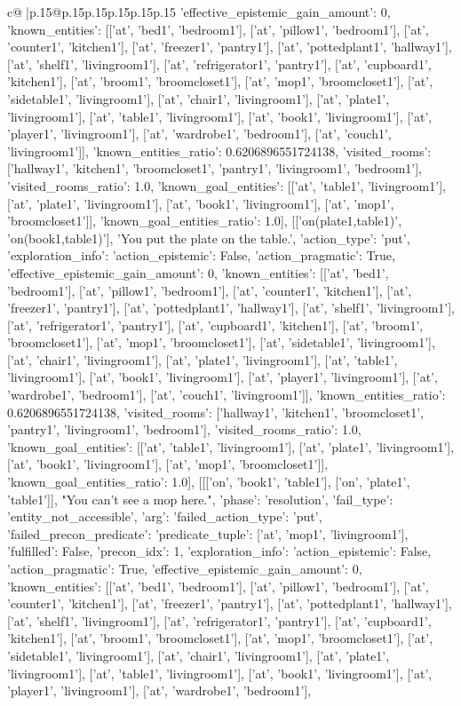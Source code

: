 \documentclass{article}
\begin{document}
{\begin{supertabular}{c@{$\;$}|p{.15\linewidth}@{}p{.15\linewidth}p{.15\linewidth}p{.15\linewidth}p{.15\linewidth}p{.15\linewidth}}
{{{'effective_epistemic_gain_amount': 0, 'known_entities': [['at', 'bed1', 'bedroom1'], ['at', 'pillow1', 'bedroom1'], ['at', 'counter1', 'kitchen1'], ['at', 'freezer1', 'pantry1'], ['at', 'pottedplant1', 'hallway1'], ['at', 'shelf1', 'livingroom1'], ['at', 'refrigerator1', 'pantry1'], ['at', 'cupboard1', 'kitchen1'], ['at', 'broom1', 'broomcloset1'], ['at', 'mop1', 'broomcloset1'], ['at', 'sidetable1', 'livingroom1'], ['at', 'chair1', 'livingroom1'], ['at', 'plate1', 'livingroom1'], ['at', 'table1', 'livingroom1'], ['at', 'book1', 'livingroom1'], ['at', 'player1', 'livingroom1'], ['at', 'wardrobe1', 'bedroom1'], ['at', 'couch1', 'livingroom1']], 'known_entities_ratio': 0.6206896551724138, 'visited_rooms': ['hallway1', 'kitchen1', 'broomcloset1', 'pantry1', 'livingroom1', 'bedroom1'], 'visited_rooms_ratio': 1.0, 'known_goal_entities': [['at', 'table1', 'livingroom1'], ['at', 'plate1', 'livingroom1'], ['at', 'book1', 'livingroom1'], ['at', 'mop1', 'broomcloset1']], 'known_goal_entities_ratio': 1.0}}], [['on(plate1,table1)', 'on(book1,table1)'], 'You put the plate on the table.', {'action_type': 'put', 'exploration_info': {'action_epistemic': False, 'action_pragmatic': True, 'effective_epistemic_gain_amount': 0, 'known_entities': [['at', 'bed1', 'bedroom1'], ['at', 'pillow1', 'bedroom1'], ['at', 'counter1', 'kitchen1'], ['at', 'freezer1', 'pantry1'], ['at', 'pottedplant1', 'hallway1'], ['at', 'shelf1', 'livingroom1'], ['at', 'refrigerator1', 'pantry1'], ['at', 'cupboard1', 'kitchen1'], ['at', 'broom1', 'broomcloset1'], ['at', 'mop1', 'broomcloset1'], ['at', 'sidetable1', 'livingroom1'], ['at', 'chair1', 'livingroom1'], ['at', 'plate1', 'livingroom1'], ['at', 'table1', 'livingroom1'], ['at', 'book1', 'livingroom1'], ['at', 'player1', 'livingroom1'], ['at', 'wardrobe1', 'bedroom1'], ['at', 'couch1', 'livingroom1']], 'known_entities_ratio': 0.6206896551724138, 'visited_rooms': ['hallway1', 'kitchen1', 'broomcloset1', 'pantry1', 'livingroom1', 'bedroom1'], 'visited_rooms_ratio': 1.0, 'known_goal_entities': [['at', 'table1', 'livingroom1'], ['at', 'plate1', 'livingroom1'], ['at', 'book1', 'livingroom1'], ['at', 'mop1', 'broomcloset1']], 'known_goal_entities_ratio': 1.0}}], [[['on', 'book1', 'table1'], ['on', 'plate1', 'table1']], "You can't see a mop here.", {'phase': 'resolution', 'fail_type': 'entity_not_accessible', 'arg': {'failed_action_type': 'put', 'failed_precon_predicate': {'predicate_tuple': ['at', 'mop1', 'livingroom1'], 'fulfilled': False, 'precon_idx': 1}}, 'exploration_info': {'action_epistemic': False, 'action_pragmatic': True, 'effective_epistemic_gain_amount': 0, 'known_entities': [['at', 'bed1', 'bedroom1'], ['at', 'pillow1', 'bedroom1'], ['at', 'counter1', 'kitchen1'], ['at', 'freezer1', 'pantry1'], ['at', 'pottedplant1', 'hallway1'], ['at', 'shelf1', 'livingroom1'], ['at', 'refrigerator1', 'pantry1'], ['at', 'cupboard1', 'kitchen1'], ['at', 'broom1', 'broomcloset1'], ['at', 'mop1', 'broomcloset1'], ['at', 'sidetable1', 'livingroom1'], ['at', 'chair1', 'livingroom1'], ['at', 'plate1', 'livingroom1'], ['at', 'table1', 'livingroom1'], ['at', 'book1', 'livingroom1'], ['at', 'player1', 'livingroom1'], ['at', 'wardrobe1', 'bedroom1'], }}}
\end{supertabular}}
\end{document}
